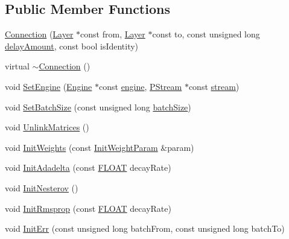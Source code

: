 \subsection*{Public Member Functions}
\begin{DoxyCompactItemize}
\item 
\hyperlink{classfractal_1_1Connection_a2e77dd8f37c2021d7b08fc012bdcd30c}{Connection} (\hyperlink{classfractal_1_1Layer}{Layer} $\ast$const from, \hyperlink{classfractal_1_1Layer}{Layer} $\ast$const to, const unsigned long \hyperlink{classfractal_1_1Connection_aeed56c0faa379d9c695e49457b63bc03}{delay\+Amount}, const bool is\+Identity)
\item 
virtual \hyperlink{classfractal_1_1Connection_a796fda5dd4b253c792d144ff483a0331}{$\sim$\+Connection} ()
\item 
void \hyperlink{classfractal_1_1Connection_a923b6313b13f60a464d417e638c4382b}{Set\+Engine} (\hyperlink{classfractal_1_1Engine}{Engine} $\ast$const \hyperlink{classfractal_1_1Connection_aed0a390a46ba6bcdff5c6238ac5b9bda}{engine}, \hyperlink{classfractal_1_1PStream}{P\+Stream} $\ast$const \hyperlink{classfractal_1_1Connection_afd1476955597e7a1fddb196fec69af82}{stream})
\item 
void \hyperlink{classfractal_1_1Connection_a09020f3027a886b7971baba901d8bf41}{Set\+Batch\+Size} (const unsigned long \hyperlink{classfractal_1_1Connection_a1c06df140701c272107c47b4ce40792b}{batch\+Size})
\item 
void \hyperlink{classfractal_1_1Connection_aab6dbd77374b404539f59d26d6c8f798}{Unlink\+Matrices} ()
\item 
void \hyperlink{classfractal_1_1Connection_a462d4925a2c205cf6c1640efe6b723be}{Init\+Weights} (const \hyperlink{classfractal_1_1InitWeightParam}{Init\+Weight\+Param} \&param)
\item 
void \hyperlink{classfractal_1_1Connection_a6beb3752a66f62f60238c22430486593}{Init\+Adadelta} (const \hyperlink{namespacefractal_a1c2d2530689575d5ccb56bae52af70d3}{F\+L\+O\+A\+T} decay\+Rate)
\item 
void \hyperlink{classfractal_1_1Connection_addddbba4b7044cad62a0541d26569f3b}{Init\+Nesterov} ()
\item 
void \hyperlink{classfractal_1_1Connection_a74c18a8efe61e4890c69b26063f74175}{Init\+Rmsprop} (const \hyperlink{namespacefractal_a1c2d2530689575d5ccb56bae52af70d3}{F\+L\+O\+A\+T} decay\+Rate)
\item 
void \hyperlink{classfractal_1_1Connection_a07f221e1751d01ed357b8bd4cc49dfbc}{Init\+Err} (const unsigned long batch\+From, const unsigned long batch\+To)

\end{DoxyCompactItemize}
